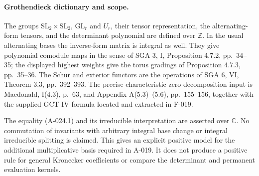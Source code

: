 \paragraph{Grothendieck dictionary and scope.}
The groups $\mathrm{SL}_2\times\mathrm{SL}_2$, $\mathrm{GL}_r$
and $U_r$, their tensor representation, the alternating-form
tensors, and the determinant polynomial are defined over
$\mathbb Z$. In the usual alternating bases the inverse-form
matrix is integral as well. They give polynomial comodule maps
in the sense of SGA 3, I, Proposition 4.7.2, pp.~34--35;
the displayed highest weights give the torus gradings of
Proposition 4.7.3, pp.~35--36. The Schur and exterior
functors are the operations of SGA 6, VI, Theorem 3.3,
pp.~392--393. The precise characteristic-zero decomposition
input is Macdonald, I(4.3), p.~63, and Appendix A(5.3)--(5.6),
pp.~155--156, together with the supplied GCT IV formula
located and extracted in F-019.

The equality (A-024.1) and its irreducible interpretation are
asserted over $\mathbb C$. No commutation of invariants with
arbitrary integral base change or integral irreducible splitting
is claimed. This gives an explicit positive model for the
additional multiplicative basis required in A-019. It does not
produce a positive rule for general Kronecker coefficients or
compare the determinant and permanent evaluation kernels.
